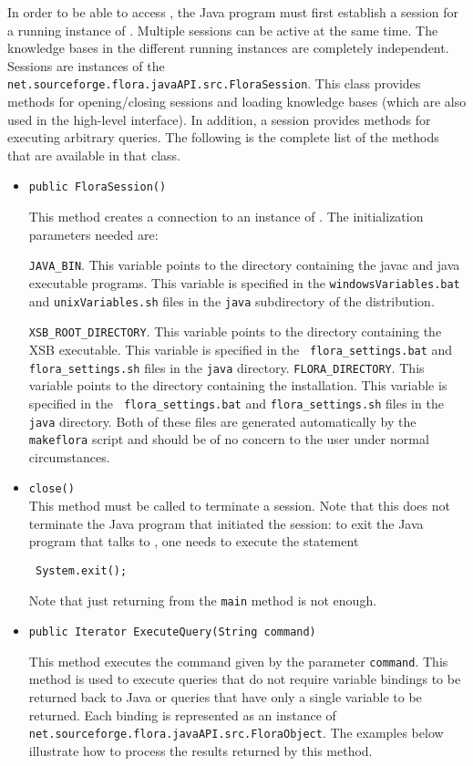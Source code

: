 In order to be able to access \FLORA, the Java program must first establish
a session for a running instance of \FLORA. Multiple sessions can be active
at the same time. The knowledge bases in the different running instances
are completely independent. Sessions are instances of
the {\tt
net.sourceforge.flora.javaAPI.src.FloraSession}. This class provides methods
for opening/closing sessions and loading \FLORA knowledge bases
(which are also used in the high-level
interface). In addition, a session provides 
methods for executing arbitrary \FLORA queries. The following is the complete
list of the methods that are available in that class.
\begin{itemize}
\item
\begin{verbatim}
public FloraSession()
\end{verbatim}
    This method creates a connection to an instance of \FLORA.
The initialization parameters needed are:

{\tt JAVA\_BIN}. This variable points to the directory containing
the javac and java executable programs. This variable is specified in
the {\tt windowsVariables.bat} and  {\tt unixVariables.sh}  files in the
{\tt java} subdirectory of the \FLORA distribution.

{\tt XSB\_ROOT\_DIRECTORY}. This variable points to the directory
containing the XSB executable. This variable is specified in the {\tt
  flora\_settings.bat} and {\tt flora\_settings.sh} files in the {\tt java}
directory.  {\tt FLORA\_DIRECTORY}. This variable points to the directory
containing the \FLORA installation. This variable is specified in the {\tt
  flora\_settings.bat} and {\tt flora\_settings.sh} files in the {\tt java}
directory.  Both of these files are generated automatically by the {\tt
  makeflora} script and should be of no concern to the user under normal
circumstances.
\item {\tt close()} \\
  This method must be called to terminate a \FLORA session. Note that this does
  not terminate the Java program that initiated the session:
  to exit the Java program that talks to \FLORA, one needs to execute
  the statement
\begin{verbatim}
 System.exit();  
\end{verbatim}
  Note that just returning from the {\tt main} method is not enough. 

\item
\begin{verbatim}
public Iterator ExecuteQuery(String command)
\end{verbatim}
    This method executes the \FLORA command given by the
parameter {\tt command}.  This method is used to execute \FLORA queries that
do not require variable bindings to be returned back to Java or queries that
have only
a single variable to be returned. Each binding is represented as
an instance of {\tt net.sourceforge.flora.javaAPI.src.FloraObject}.
The examples below illustrate how to process the results returned by this
method.


\end{itemize}
